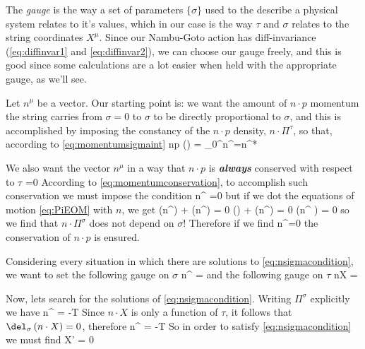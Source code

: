 \documentclass[oneside, 12pt]{book}
\begin{document}
The \textit{gauge} is the way a set of parameters \(\{\sigma\}\) used to the describe a physical system relates to it's values, which in our case is the way \(\tau\) and \(\sigma\) relates to the string coordinates \(X^{\mu}\). Since our Nambu-Goto action has diff-invariance (\eqref{eq:diffinvar1} and \eqref{eq:diffinvar2}), we can choose our gauge freely, and this is good since some calculations are a lot easier when held with the appropriate gauge, as we'll see.\par

Let \(n^{\mu}\) be a vector. Our starting point is: we want the amount of \(n\cdot p\) momentum the string carries from \(\sigma=0\) to \(\sigma\) to be directly proportional to \(\sigma\), and this is accomplished by imposing the constancy of the \(n\cdot p\) density, \(n\cdot \Pi^{\tau}\), so that, according to \eqref{eq:momentumsigmaint}
\beq[eq:npsigma] n\cdot p (\sigma) = \int_0^{\sigma}n\cdot \Pi^{\tau}\dd{\sigma}=n\cdot \Pi^{\tau}*\sigma \eeq\par

We also want the vector \(n^{\mu}\) in a way that \(n\cdot p\) is \textit{\textbf{always}} conserved with respect to \(\tau\)
\beq[]  =0 \eeq
According to \eqref{eq:momentumconservation}, to accomplish such conservation we must impose the condition
\beq[] n\cdot \Pi^{\sigma} =0  \eeq
but if we dot the equations of motion \eqref{eq:PiEOM} with \(n\), we get
\beq[] \pdv{\tau}\left(n\cdot \Pi^{\tau}\right) + \pdv{\sigma}\left(n\cdot\Pi^{\sigma}\right)  = 0\eeq
\beq[] \pdv{\tau}\left(\right) + \pdv{\sigma}\left(n\cdot\Pi^{\sigma}\right)  = 0 \eeq
\beq[] \pdv{\sigma} \left(n\cdot \Pi^{\sigma} \right) = 0\eeq
so we find that \( n\cdot \Pi^{\sigma}\) does not depend on \(\sigma\)! Therefore if we find
\beq[eq:nsigmacondition] n\cdot \Pi^{\sigma}=0  \eeq
the conservation of \(n\cdot p\) is ensured.\par

Considering every situation in which there are solutions to \eqref{eq:nsigmacondition}, we want to set the following gauge on \(\sigma\)
\beq[eq:sigmagauge] n\cdot \Pi^{\tau} =  \eeq
and the following gauge on \(\tau\)
\beq[eq:taugauge] n\cdot X =  \tau \eeq\par

Now, lets search for the solutions of \eqref{eq:nsigmacondition}. Writing \(\Pi^{\sigma}\) explicitly we have
\beq[] n\cdot \Pi^{\sigma} = -T  \eeq
Since \(n\cdot X\) is only a function of \(\tau\), it follows that \(\del_{\sigma}\left(n\cdot X \right) = 0\), therefore
\beq[] n\cdot \Pi^{\sigma} = -T  \eeq
So in order to satisfy \eqref{eq:nsigmacondition} we must find
\beq[eq:gaugeXXconstrain] \cdot X' = 0  \eeq\par
\end{document}
